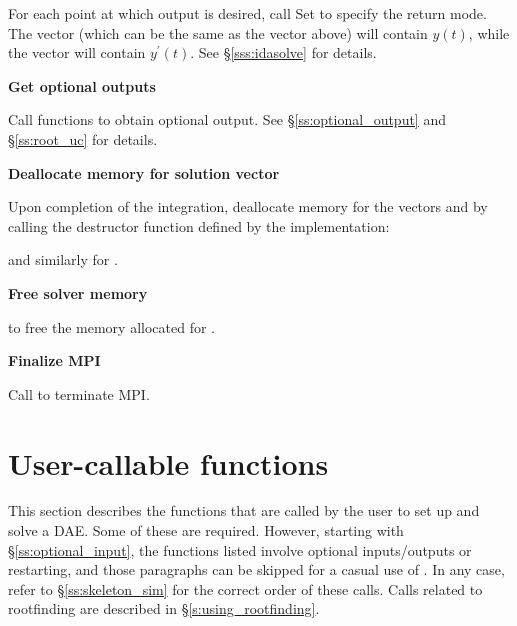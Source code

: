 \begin{Steps}
  For each point at which output is desired, call
  Set  to specify the return mode.
  The vector  (which can be the same as
  the vector  above) will contain $y(t)$,
  while the vector  will contain $y^\prime(t)$.
  See \S\ref{sss:idasolve} for details.
  
\item
  {\bf Get optional outputs}

  Call  functions to obtain optional output.
  See \S\ref{ss:optional_output} and \S\ref{ss:root_uc} for details.

\item
  {\bf Deallocate memory for solution vector}

  Upon completion of the integration, deallocate memory for the vectors 
  and  by calling the destructor function defined by the {\nvector} 
  implementation:

  {\s} 

  {\p} 
  
  and similarly for .
  
\item
  {\bf Free solver memory}

   to free the memory allocated for {\ida}.
  
\item 
  {\bf {\p} Finalize MPI}
  
  Call  to terminate MPI.

\end{Steps}

\section{User-callable functions}
\label{ss:ida_fct_sim}

This section describes the {\ida} functions that are called by the
user to set up and solve a DAE. Some of these are required. However,
starting with \S\ref{ss:optional_input}, the functions listed involve
optional inputs/outputs or restarting, and those paragraphs can be
skipped for a casual use of {\ida}. In any case, refer to
\S\ref{ss:skeleton_sim} for the correct order of these calls.
Calls related to rootfinding are described in \S\ref{s:using_rootfinding}.

